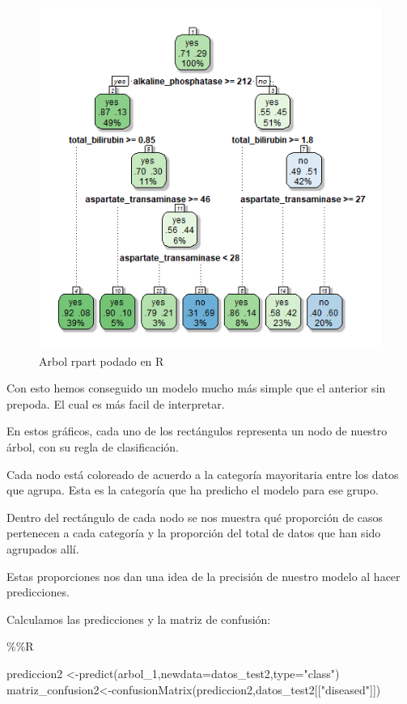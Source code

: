 \documentclass[
  11pt,
  a4paper,
]{article}
\newenvironment{Shaded}{\begin{snugshade}}{\end{snugshade}}
\newcommand{\AttributeTok}[1]{\textcolor[rgb]{0.77,0.63,0.00}{#1}}
\newcommand{\FunctionTok}[1]{\textcolor[rgb]{0.00,0.00,0.00}{#1}}
\newcommand{\NormalTok}[1]{#1}
\newcommand{\OtherTok}[1]{\textcolor[rgb]{0.56,0.35,0.01}{#1}}
\newcommand{\SpecialCharTok}[1]{\textcolor[rgb]{0.00,0.00,0.00}{#1}}
\newcommand{\StringTok}[1]{\textcolor[rgb]{0.31,0.60,0.02}{#1}}
\begin{document}
\begin{figure}
\centering
\includegraphics{output_234_0.png}
\caption{Arbol rpart podado en R}
\end{figure}

\newpage

Con esto hemos conseguido un modelo mucho más simple que el anterior sin
prepoda. El cual es más facil de interpretar.

En estos gráficos, cada uno de los rectángulos representa un nodo de
nuestro árbol, con su regla de clasificación.

Cada nodo está coloreado de acuerdo a la categoría mayoritaria entre los
datos que agrupa. Esta es la categoría que ha predicho el modelo para
ese grupo.

Dentro del rectángulo de cada nodo se nos muestra qué proporción de
casos pertenecen a cada categoría y la proporción del total de datos que
han sido agrupados allí.

Estas proporciones nos dan una idea de la precisión de nuestro modelo al
hacer predicciones.

\vspace{0.25cm}

Calculamos las predicciones y la matriz de confusión:

\begin{Shaded}
\begin{Highlighting}[]
\SpecialCharTok{\%\%}\NormalTok{R}

\NormalTok{prediccion2 }\OtherTok{\textless{}{-}}\FunctionTok{predict}\NormalTok{(arbol\_1,}\AttributeTok{newdata=}\NormalTok{datos\_test2,}\AttributeTok{type=}\StringTok{"class"}\NormalTok{)}
\NormalTok{matriz\_confusion2}\OtherTok{\textless{}{-}}\FunctionTok{confusionMatrix}\NormalTok{(prediccion2,datos\_test2[[}\StringTok{"diseased"}\NormalTok{]])}
\end{Highlighting}
\end{Shaded}
\end{document}
